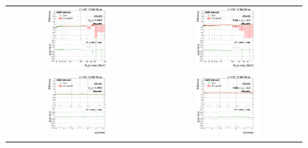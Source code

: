 \begin{figure}[bh]
  \begin{center}
    \begin{tabular}{cc}
      \includegraphics[width=0.45\textwidth]{figures/Zprime/2017/ScaleFactor/SameSign/N-1/g_compare_cut_Et_Barrel_ea_ta_inc_AS_N_1_EMHD1Iso_PUW.png} &
      \includegraphics[width=0.45\textwidth]{figures/Zprime/2017/ScaleFactor/SameSign/N-1/g_compare_cut_Et_Endcap_ea_ta_inc_AS_N_1_EMHD1Iso_PUW.png} \\
      \includegraphics[width=0.45\textwidth]{figures/Zprime/2017/ScaleFactor/SameSign/N-1/g_compare_cut_phi_Barrel_ea_ta_inc_AS_N_1_EMHD1Iso_PUW.png} &
      \includegraphics[width=0.45\textwidth]{figures/Zprime/2017/ScaleFactor/SameSign/N-1/g_compare_cut_phi_Endcap_ea_ta_inc_AS_N_1_EMHD1Iso_PUW.png} \\

\end{tabular}
\end{center}
\end{figure}
